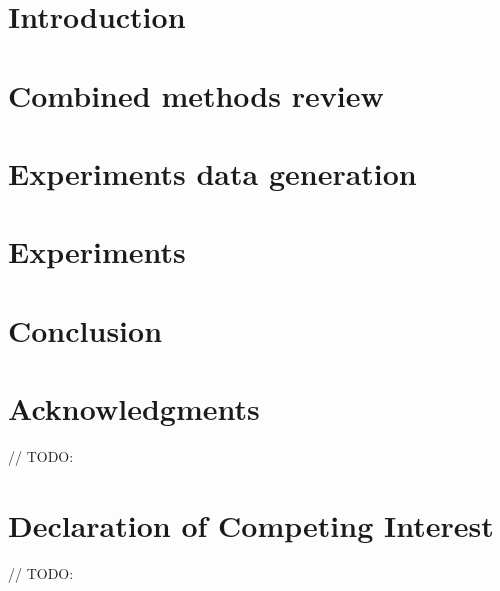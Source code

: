 \documentclass{TST}
\begin{document}
\maketitle


\section{Introduction}

\section{Combined methods review}


\section{Experiments data generation}


\section{Experiments}


\section{Conclusion}


\section*{Acknowledgments}
// TODO:

\section*{Declaration of Competing Interest}
// TODO:



\end{document}
